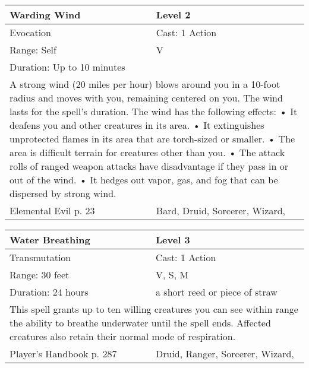 \documentclass[11pt]{report}
\begin{document}
\begin{table}[H]
	\begin{tabular}{||p{6cm}|p{6cm}||}
		\hline\hline
		\bf{Warding Wind} & Level 2\\ \hline
		Evocation & Cast: 1 Action\\ \hline
		Range: Self & V\\ \hline
		Duration: Up to 10 minutes & \\ \hline
		\multicolumn{2}{||p{12cm}||}{A strong wind (20 miles per hour) blows around you in a 10-foot radius and moves with you, remaining centered on you. The wind lasts for the spell’s duration.
The wind has the following effects:
• It deafens you and other creatures in its area.
• It extinguishes unprotected flames in its area that are torch-sized or smaller.
• The area is difficult terrain for creatures other than you.
• The attack rolls of ranged weapon attacks have disadvantage if they pass in or out of the wind.
• It hedges out vapor, gas, and fog that can be dispersed by strong wind.}\\ \hline
Elemental Evil p. 23 & Bard, Druid, Sorcerer, Wizard, \\ \hline\hline
	\end{tabular}
\end{table}

\begin{table}[H]
	\begin{tabular}{||p{6cm}|p{6cm}||}
		\hline\hline
		\bf{Water Breathing} & Level 3\\ \hline
		Transmutation & Cast: 1 Action\\ \hline
		Range: 30 feet & V, S, M\\ \hline
		Duration: 24 hours & a short reed or piece of straw\\ \hline
		\multicolumn{2}{||p{12cm}||}{This spell grants up to ten willing creatures you can see within range the ability to breathe underwater until the spell ends. Affected creatures also retain their normal mode of respiration.}\\ \hline
Player's Handbook p. 287 & Druid, Ranger, Sorcerer, Wizard, \\ \hline\hline
	\end{tabular}
\end{table}
\end{document}
